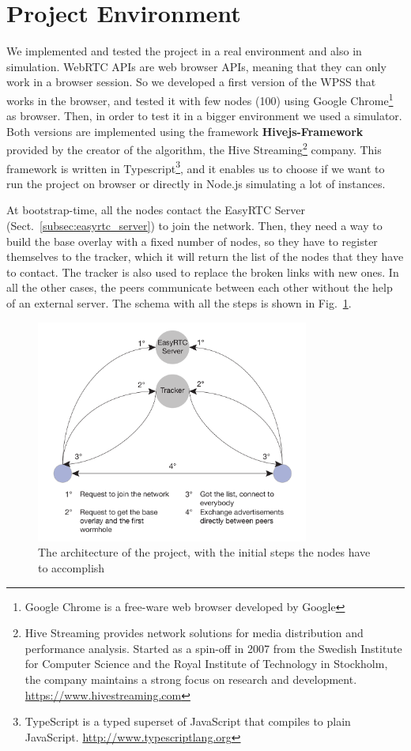\section{Project Environment}
\label{cha:design}
We implemented and tested the project in a real environment and also in simulation. WebRTC APIs are web browser APIs, meaning that they can only work in a browser session. So we developed a first version of the \ac{WPSS} that works in the browser, and tested it with few nodes (100) using Google Chrome\footnote{Google Chrome is a free-ware web browser developed by Google} as browser. Then, in order to test it in a bigger environment we used a simulator. Both versions are implemented using the framework \textbf{Hivejs-Framework} provided by the creator of the algorithm, the Hive Streaming\footnote{Hive Streaming provides network solutions for media distribution and performance analysis. Started as a spin-off in 2007 from the Swedish Institute for Computer Science and the Royal Institute of Technology in Stockholm, the company maintains a strong focus on research and development. \url{https://www.hivestreaming.com}} company. This framework is written in Typescript\footnote{TypeScript is a typed superset of JavaScript that compiles to plain JavaScript. \url{http://www.typescriptlang.org}}, and it enables us to choose if we want to run the project on browser or directly in Node.js simulating a lot of instances. 

At bootstrap-time, all the nodes contact the EasyRTC Server (Sect.~\ref{subsec:easyrtc_server}) to join the network. Then, they need a way to build the base overlay with a fixed number of nodes, so they have to register themselves to the tracker, which it will return the list of the nodes that they have to contact. The tracker is also used to replace the broken links with new ones. In all the other cases, the peers communicate between each other without the help of an external server. The schema with all the steps is shown in Fig.~\ref{fig:project_architecture}.

\begin{figure}[ht]
  \centering
  \includegraphics[keepaspectratio=true, width=0.8\textwidth]{images/project_architecture}\caption{The architecture of the project, with the initial steps the nodes have to accomplish}
  \label{fig:project_architecture}
\end{figure}


